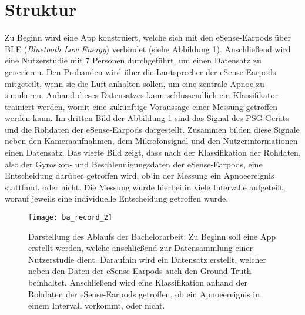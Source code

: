 \section{Struktur}
Zu Beginn wird eine App konstruiert, welche sich mit den eSense-Earpods über BLE (\textit{Bluetooth Low Energy}) verbindet (siehe Abbildung \ref{introduction:ba_record}).
Anschließend wird eine Nutzerstudie mit 7 Personen durchgeführt, um einen Datensatz zu generieren.
Den Probanden wird über die Lautsprecher der eSense-Earpods mitgeteilt, wenn sie die Luft anhalten sollen, um eine zentrale Apnoe zu simulieren.
Anhand dieses Datensatzes kann schlussendlich ein Klassifikator trainiert werden, womit eine zukünftige Voraussage einer Messung getroffen werden kann.
Im dritten Bild der Abbildung \ref{introduction:ba_record} sind das Signal des PSG-Geräts und die Rohdaten der eSense-Earpods dargestellt. 
Zusammen bilden diese Signale neben den Kameraaufnahmen, dem Mikrofonsignal und den Nutzerinformationen einen Datensatz.
Das vierte Bild zeigt, dass nach der Klassifikation der Rohdaten, also der Gyroskop- und Beschleunigungsdaten der eSense-Earpods, eine Entscheidung darüber getroffen wird, ob in der Messung ein Apnoeereignis stattfand, oder nicht.
Die Messung wurde hierbei in viele Intervalle aufgeteilt, worauf jeweils eine individuelle Entscheidung getroffen wurde.

\begin{figure}[h]
  \centering
  \texttt{[image: ba\_record\_2]}
  \caption{Darstellung des Ablaufs der Bachelorarbeit: Zu Beginn soll eine App erstellt werden, welche anschließend zur Datensammlung einer Nutzerstudie dient. Daraufhin wird ein Datensatz erstellt, welcher neben den Daten der eSense-Earpods auch den Ground-Truth beinhaltet. Anschließend wird eine Klassifikation anhand der Rohdaten der eSense-Earpods getroffen, ob ein Apnoeereignis in einem Intervall vorkommt, oder nicht.}
  \label{introduction:ba_record}
\end{figure}